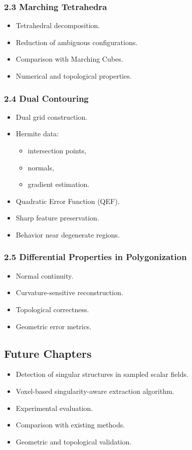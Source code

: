 \documentclass[12pt,a4paper]{article}
\begin{document}
\subsubsection*{2.3 Marching Tetrahedra}
\begin{itemize}
    \item Tetrahedral decomposition.
    \item Reduction of ambiguous configurations.
    \item Comparison with Marching Cubes.
    \item Numerical and topological properties.
\end{itemize}

\subsubsection*{2.4 Dual Contouring}
\begin{itemize}
    \item Dual grid construction.
    \item Hermite data:
    \begin{itemize}
        \item intersection points,
        \item normals,
        \item gradient estimation.
    \end{itemize}
    \item Quadratic Error Function (QEF).
    \item Sharp feature preservation.
    \item Behavior near degenerate regions.
\end{itemize}

\subsubsection*{2.5 Differential Properties in Polygonization}
\begin{itemize}
    \item Normal continuity.
    \item Curvature-sensitive reconstruction.
    \item Topological correctness.
    \item Geometric error metrics.
\end{itemize}

\subsection*{Future Chapters}
\begin{itemize}
    \item Detection of singular structures in sampled scalar fields.
    \item Voxel-based singularity-aware extraction algorithm.
    \item Experimental evaluation.
    \item Comparison with existing methods.
    \item Geometric and topological validation.
\end{itemize}
\end{document}
